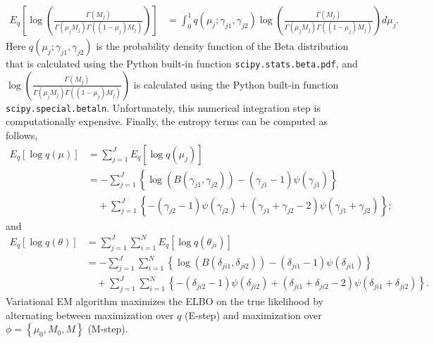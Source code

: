\documentclass{bmcart}
\begin{document}
\begin{equation}\label{eqn:integration}
\begin{split}
E_q\left[ \log \left( \frac{ \Gamma(M_j) } { \Gamma(\mu_j M_j) \Gamma((1-\mu_j)M_j ) }\right)\right] &= \int_{0}^{1} q(\mu_j;\gamma_{j1}, \gamma_{j2}) \log \left( \frac{ \Gamma(M_j) } { \Gamma(\mu_j M_j) \Gamma((1-\mu_j)M_j ) }\right) d\mu_j.
\end{split}
\end{equation}
Here $q(\mu_j;\gamma_{j1}, \gamma_{j2})$ is the probability density function of the Beta distribution that is calculated using the Python built-in function \texttt{scipy.stats.beta.pdf},
and $\log \left( \frac{ \Gamma(M_j) } { \Gamma(\mu_j M_j) \Gamma((1-\mu_j)M_j ) }\right)$ is calculated using the Python built-in function \texttt{scipy.special.betaln}.
Unfortunately, this numerical integration step is computationally expensive.
%
Finally, the entropy terms can be computed as follows,
\begin{equation}
\begin{split}
E_q \left[ \log q\left(\mu \right)\right] &= \sum_{j=1}^{J} E_q \left[ \log q(\mu_j)\right] \\
&= -\sum_{j=1}^{J} \left\lbrace \log (B(\gamma_{j1},\gamma_{j2})) -(\gamma_{j1}-1)\psi(\gamma_{j1}) \right\rbrace \\
&\quad  + \sum_{j=1}^{J} \left\lbrace -(\gamma_{j2}-1)\psi(\gamma_{j2}) + (\gamma_{j1}+\gamma_{j2}-2)\psi(\gamma_{j1}+\gamma_{j2})\right\rbrace;
\end{split}
\end{equation}
and
\begin{equation}
\begin{split}
E_q \left[ \log q\left(\theta \right)\right] &= \sum_{j=1}^{J}\sum_{i=1}^{N} E_q\left[ \log q(\theta_{ji})\right] \\
&= -\sum_{j=1}^{J}\sum_{i=1}^{N} \left\lbrace \log (B(\delta_{ji1},\delta_{ji2}))-(\delta_{ji1}-1)\psi(\delta_{ji1}) \right\rbrace \\
&\quad + \sum_{j=1}^{J}\sum_{i=1}^{N} \left\lbrace -(\delta_{ji2}-1)\psi(\delta_{ji2}) + (\delta_{ji1}+\delta_{ji2}-2)\psi(\delta_{ji1}+\delta_{ji2})\right\rbrace.
\end{split}
\end{equation}
%
Variational EM algorithm maximizes the ELBO on the true likelihood by alternating between maximization over $q$ (E-step) and maximization over $\phi= \left\{\mu_0, M_0, M \right\}$ (M-step).
\end{document}
